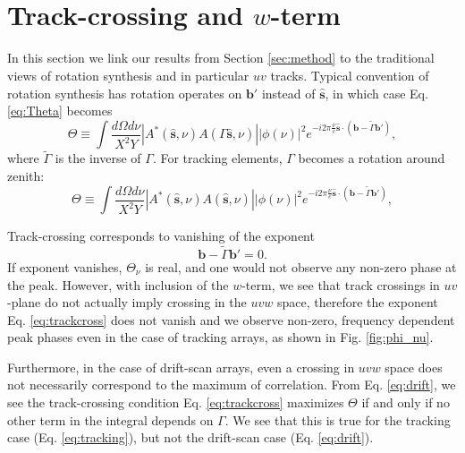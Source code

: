 \documentclass[twocolumn,apj,numberedappendix]{emulateapj}
\renewcommand\[{\begin{equation}}
\renewcommand\]{\end{equation}}
\begin{document}
\pagebreak



\appendix
\section{\\Track-crossing and $w$-term \label{sec:appA}}
\label{sec:appA}
In this section we link our results from Section \ref{sec:method} to the traditional views of rotation synthesis and in particular $uv$ tracks. 
Typical convention of rotation synthesis has rotation operates on $\boldsymbol{b'}$ instead of $\hat{\boldsymbol{s}}$, in which case Eq.\ref{eq:Theta} becomes
\begin{equation}
\Theta \equiv\int\frac{d\Omega d\nu}{X^{2}Y}|A^{*}(\hat{\boldsymbol{s}},\nu)A(\Gamma\hat{\boldsymbol{s}},\nu)||\phi(\nu)|^{2} e^{-i2\pi\frac{\nu}{c}\hat{\boldsymbol{s}}\cdot\left(\boldsymbol{b}-\widetilde{\Gamma}\boldsymbol{b'}\right)}, 
\label{eq:drift}
\end{equation}
where $\widetilde{\Gamma}$ is the inverse of $\Gamma$. 
For tracking elements, $\Gamma$ becomes a rotation around zenith:
\begin{equation}
\Theta \equiv\int\frac{d\Omega d\nu}{X^{2}Y}|A^{*}(\hat{\boldsymbol{s}},\nu)A(\hat{\boldsymbol{s}},\nu)||\phi(\nu)|^{2} e^{-i2\pi\frac{\nu}{c}\hat{\boldsymbol{s}}\cdot\left(\boldsymbol{b}-\widetilde{\Gamma}\boldsymbol{b'}\right)}, 
\label{eq:tracking}
\end{equation}

Track-crossing corresponds to vanishing of the exponent
\[
 \boldsymbol{b}-\widetilde{\Gamma}\boldsymbol{b'} = 0. \label{eq:trackcross}
 \]
If exponent vanishes, $\Theta_{\nu}$ is real, and one would not observe any non-zero phase at the peak. However, with inclusion of the $w$-term, we see that track crossings in $uv$-plane do not actually imply crossing in the $uvw$ space, therefore the exponent Eq. \ref{eq:trackcross} does not vanish and we observe non-zero, frequency dependent peak phases even in the case of tracking arrays, as shown in Fig. \ref{fig:phi_nu}. 

Furthermore, in the case of drift-scan arrays, even a crossing in $uvw$ space does not necessarily correspond to the maximum of correlation. From Eq. \ref{eq:drift}, we see the track-crossing condition Eq. \ref{eq:trackcross} maximizes $\Theta$ if and only if no other term in the integral depends on $\Gamma$. We see that this is true for the tracking case (Eq. \ref{eq:tracking}), but not the drift-scan case (Eq. \ref{eq:drift}). 
\end{document}
